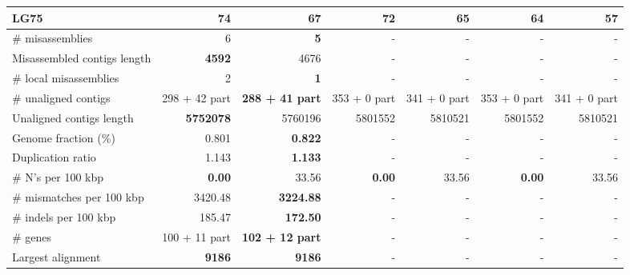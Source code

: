 \documentclass[12pt,a4paper]{article}
\begin{document}
\begin{table}[ht]
\begin{center}
\begin{tabular}{|l*{6}{|r}|}
LG75 & 74 & 67 & 72 & 65 & 64 & {\bf 57} \\ \hline
\# misassemblies & 6 & {\bf 5} & - & - & - & - \\ \hline
Misassembled contigs length & {\bf 4592} & 4676 & - & - & - & - \\ \hline
\# local misassemblies & 2 & {\bf 1} & - & - & - & - \\ \hline
\# unaligned contigs & 298 + 42 part & {\bf 288 + 41 part} & 353 + 0 part & 341 + 0 part & 353 + 0 part & 341 + 0 part \\ \hline
Unaligned contigs length & {\bf 5752078} & 5760196 & 5801552 & 5810521 & 5801552 & 5810521 \\ \hline
Genome fraction (\%) & 0.801 & {\bf 0.822} & - & - & - & - \\ \hline
Duplication ratio & 1.143 & {\bf 1.133} & - & - & - & - \\ \hline
\# N's per 100 kbp & {\bf 0.00} & 33.56 & {\bf 0.00} & 33.56 & {\bf 0.00} & 33.56 \\ \hline
\# mismatches per 100 kbp & 3420.48 & {\bf 3224.88} & - & - & - & - \\ \hline
\# indels per 100 kbp & 185.47 & {\bf 172.50} & - & - & - & - \\ \hline
\# genes & 100 + 11 part & {\bf 102 + 12 part} & - & - & - & - \\ \hline
Largest alignment & {\bf 9186} & {\bf 9186} & - & - & - & - \\ \hline
\end{tabular}
\end{center}
\end{table}
\end{document}
